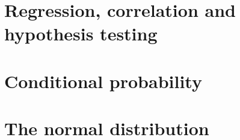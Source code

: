 \chapter{Regression, correlation and hypothesis testing}


\chapter{Conditional probability}


\chapter{The normal distribution}

